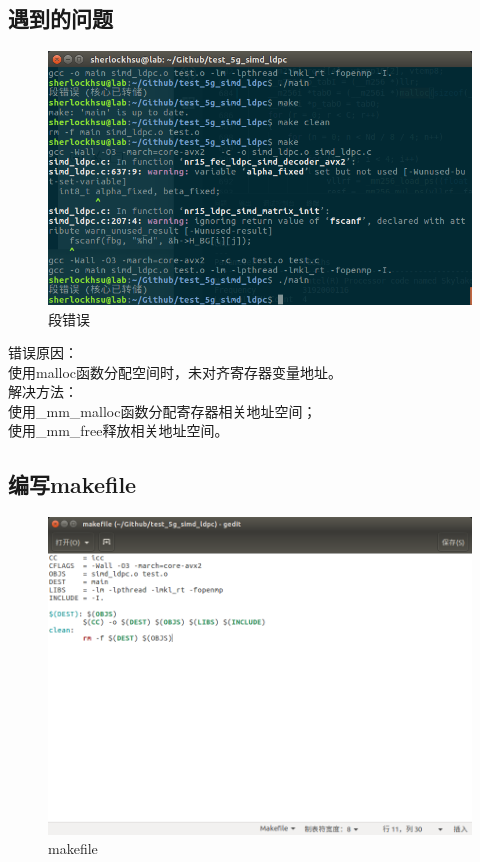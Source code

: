 \documentclass{article}
\begin{document}
\subsection{遇到的问题}
\begin{figure}[H]
	\centering
	\includegraphics[width = \textwidth]{err.png}
	\caption{段错误}
\end{figure}
错误原因：\\
使用malloc函数分配空间时，未对齐寄存器变量地址。\\
解决方法：\\
使用\_mm\_malloc函数分配寄存器相关地址空间；\\
使用\_mm\_free释放相关地址空间。
\subsection{编写makefile}
\begin{figure}[H]
	\centering
	\includegraphics[width = \textwidth]{makefile.png}
	\caption{makefile}
\end{figure}
\end{document}

